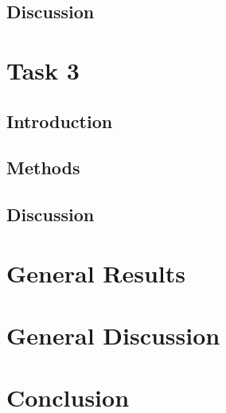 \documentclass[11pt,a4paper]{article}
\begin{document}


\subsection{Discussion}


\section{Task 3}
\subsection{Introduction}
\label{sec:intro}

\subsection{Methods}

\subsection{Discussion}

\section{General Results}

\section{General Discussion}

\section{Conclusion}
\end{document}
